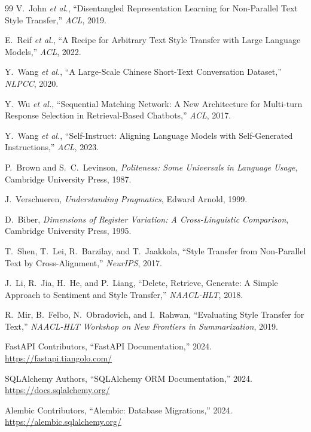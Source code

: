 \documentclass[12pt,a4paper]{ctexart}
\begin{document}
\begin{thebibliography}{99}
V.~John \emph{et al.}, ``Disentangled Representation Learning for Non-Parallel Text Style Transfer,'' \emph{ACL}, 2019.



E.~Reif \emph{et al.}, ``A Recipe for Arbitrary Text Style Transfer with Large Language Models,'' \emph{ACL}, 2022.



Y.~Wang \emph{et al.}, ``A Large-Scale Chinese Short-Text Conversation Dataset,'' \emph{NLPCC}, 2020.


Y.~Wu \emph{et al.}, ``Sequential Matching Network: A New Architecture for Multi-turn Response Selection in Retrieval-Based Chatbots,'' \emph{ACL}, 2017.


Y.~Wang \emph{et al.}, ``Self-Instruct: Aligning Language Models with Self-Generated Instructions,'' \emph{ACL}, 2023.



P.~Brown and S.~C.~Levinson, \emph{Politeness: Some Universals in Language Usage}, Cambridge University Press, 1987.



J.~Verschueren, \emph{Understanding Pragmatics}, Edward Arnold, 1999.



D.~Biber, \emph{Dimensions of Register Variation: A Cross-Linguistic Comparison}, Cambridge University Press, 1995.


T.~Shen, T.~Lei, R.~Barzilay, and T.~Jaakkola, ``Style Transfer from Non-Parallel Text by Cross-Alignment,'' \emph{NeurIPS}, 2017.

J.~Li, R.~Jia, H.~He, and P.~Liang, ``Delete, Retrieve, Generate: A Simple Approach to Sentiment and Style Transfer,'' \emph{NAACL-HLT}, 2018.

R.~Mir, B.~Felbo, N.~Obradovich, and I.~Rahwan, ``Evaluating Style Transfer for Text,'' \emph{NAACL-HLT Workshop on New Frontiers in Summarization}, 2019.


FastAPI Contributors, ``FastAPI Documentation,'' 2024. \url{https://fastapi.tiangolo.com/}

SQLAlchemy Authors, ``SQLAlchemy ORM Documentation,'' 2024. \url{https://docs.sqlalchemy.org/}

Alembic Contributors, ``Alembic: Database Migrations,'' 2024. \url{https://alembic.sqlalchemy.org/}


\end{thebibliography}
\end{document}
